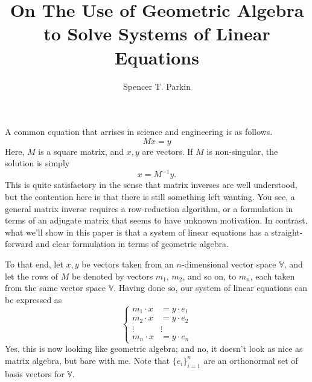 \documentclass[12pt]{article}
\title{On The Use of Geometric Algebra\\to Solve Systems of Linear Equations}
\author{Spencer T. Parkin}
\newcommand{\V}{\mathbb{V}}
\begin{document}
\maketitle

A common equation that arrises in science and engineering is as follows.
\begin{equation}
Mx=y
\end{equation}
Here, $M$ is a square matrix, and $x,y$ are vectors.  If $M$ is non-singular, the solution is simply
\begin{equation}\label{equ_matrix_algebra_solved}
x=M^{-1}y.
\end{equation}
This is quite satisfactory in the sense that matrix inverses are well understood, but the contention here is that
there is still something left wanting.  You see, a general matrix inverse requires a row-reduction algorithm, or
a formulation in terms of an adjugate matrix that seems to have unknown motivation.  In contrast, what we'll show in this paper is that a
system of linear equations has a straight-forward and clear formulation in terms of geometric algebra.

To that end, let $x,y$ be vectors taken from an $n$-dimensional vector space $\V$, and let the rows of $M$
be denoted by vectors $m_1$, $m_2$, and so on, to $m_n$, each taken from the same vector space $\V$.
Having done so, our system of linear equations can be expressed as
\begin{equation}\label{equ_linear_system}
\left\{
\begin{array}{cc}
m_1\cdot x &= y\cdot e_1 \\
m_2\cdot x &= y\cdot e_2 \\
\vdots & \vdots \\
m_n\cdot x &= y\cdot e_n
\end{array}
\right.
\end{equation}
Yes, this is now looking like geometric algebra; and no, it doesn't look as nice as matrix algebra,
but bare with me.  Note that $\{e_i\}_{i=1}^n$ are an orthonormal set of basis vectors for $\V$.
\end{document}
